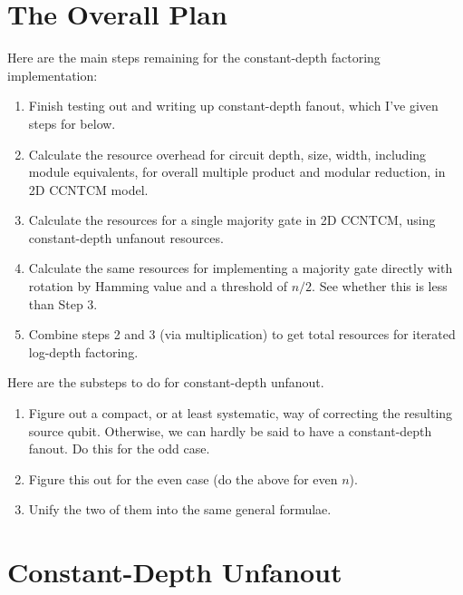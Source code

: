 \documentclass{article}
\begin{document}
\section{The Overall Plan}

Here are the main steps remaining for the constant-depth factoring
implementation:

\begin{enumerate}

\item
Finish testing out and writing up constant-depth fanout, which I've
given steps for below.

\item
Calculate the resource overhead for circuit depth, size, width,
including module equivalents, for overall multiple product and
modular reduction, in \textsf{2D CCNTCM} model.

\item
Calculate the resources for a single majority gate in \textsf{2D CCNTCM},
using constant-depth unfanout resources.

\item
Calculate the same resources for implementing a majority gate
directly with rotation by Hamming value and a threshold of
$n/2$. See whether this is less than Step 3.

\item
Combine steps 2 and 3 (via multiplication) to get total resources
for iterated log-depth factoring.

\end{enumerate}

Here are the substeps to do for constant-depth unfanout.

\begin{enumerate}
\item Figure out a compact, or at least systematic, way of correcting the
resulting source qubit. Otherwise, we can hardly be said to have a
constant-depth fanout. Do this for the odd case.

\item Figure this out for the even case (do the above for even $n$).

\item Unify the two of them into the same general formulae.

\end{enumerate}

\section{Constant-Depth Unfanout}
\end{document}
